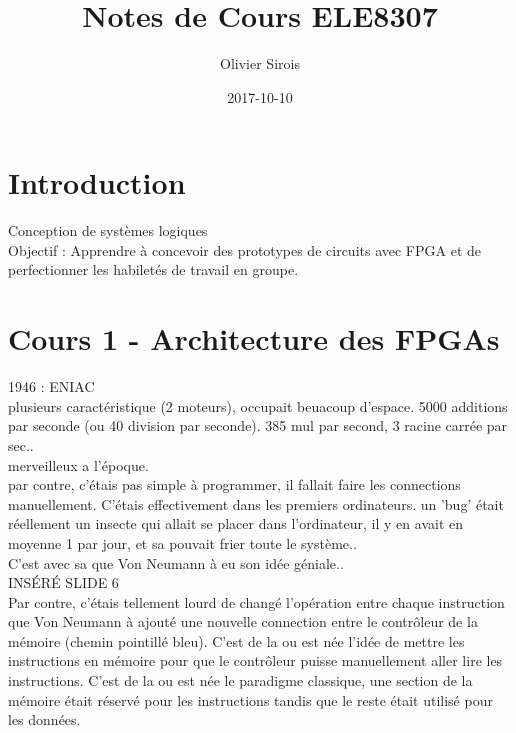 \documentclass[oneside]{book}
\title{Notes de Cours ELE8307}
\date{2017-10-10}
\author{Olivier Sirois}
\begin{document}
    \setcounter{page}{1}
    \maketitle
    \tableofcontents
    
    \chapter{Introduction}
        Conception de systèmes logiques\\
    
        Objectif : Apprendre à concevoir des prototypes de circuits avec FPGA et de perfectionner les habiletés de travail en groupe.\\
        
        
    \chapter{Cours 1 - Architecture des FPGAs}
        1946 : ENIAC\\
        plusieurs caractéristique (2 moteurs), occupait beuacoup d'espace. 5000 additions par seconde (ou 40 division par seconde). 385 mul par second, 3 racine carrée par sec..\\
        
        merveilleux a l'époque.\\
        
        par contre, c'étais pas simple à programmer, il fallait faire les connections manuellement. C'étais effectivement dans les premiers ordinateurs. un 'bug' était réellement un insecte qui allait se placer dans l'ordinateur, il y en avait en moyenne 1 par jour, et sa pouvait frier toute le système..\\
        
        C'est avec sa que Von Neumann à eu son idée géniale..\\
        
        INSÉRÉ SLIDE 6\\
        
        Par contre, c'étais tellement lourd de changé l'opération entre chaque instruction que Von Neumann à ajouté une nouvelle connection entre le contrôleur de la mémoire (chemin pointillé bleu). C'est de la ou est née l'idée de mettre les instructions en mémoire pour que le contrôleur puisse manuellement aller lire les instructions. C'est de la ou est née le paradigme classique, une section de la mémoire était réservé pour les instructions tandis que le reste était utilisé pour les données.
\end{document}
